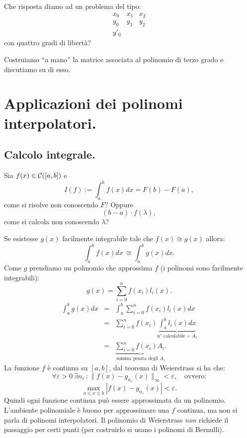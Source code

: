 \begin{ese}
Che risposta diamo ad un problema del tipo:
\[\begin{array}{ccc}
x_0 & x_1 & x_2 \\
y_0 & y_1 & y_2 \\
y'_0
\end{array}\]
con quattro gradi di libertà?
\begin{flushleft}
Costruiamo ``a mano'' la matrice associata al polinomio di terzo grado e
discutiamo su di esso.
\end{flushleft}
\end{ese}

\section{Applicazioni dei polinomi interpolatori.}
\subsection*{Calcolo integrale.}
Sia $f(x) \in \mathcal{C}([a,b])$ e
\[I(f) := \int_a^bf(x)dx = F(b)-F(a),\]
come si risolve non conoscendo $F$? Oppure
\[(b-a)\cdot f(\lambda),\]
come si calcola non conoscendo $\lambda$?
\begin{flushleft}
Se esistesse $g(x)$ facilmente integrabile tale che $f(x) \cong g(x)$ allora:
\[\int_a^bf(x)dx\, \cong \int_a^bg(x)dx.\]
Come $g$ prendiamo un polinomio che approssima $f$ (i polinomi sono
facilmente integrabili):
\[g(x) = \sum_{i = 0}^nf(x_i)l_i(x).\]
\[
\begin{array}{lcl}\displaystyle
\int_a^bg(x)dx & = & \displaystyle\int_a^b\sum_{i = 0}^nf(x_i)l_i(x)dx \\
& = & \displaystyle
\sum_{i = 0}^nf(x_i)\underbrace{\int_a^bl_i(x)dx}_{\textrm{n° calcolabile}
= A_i} \\
& = & \displaystyle
\underbrace{\sum_{i = 0}^nf(x_i)A_i.}_{\textrm{somma pesata degli }A_i}
\end{array}
\]
La funzione $f$ è continua su $[a,b]$, dal teorema di Weierstrass si ha che:
\[\forall \varepsilon > 0\ \exists n_{\varepsilon} \, \colon \|f(x) -
g_{n_{\varepsilon}}(x)\|_{\infty} < \varepsilon, \quad \textrm{ovvero:}\]
\[\max_{a \leq x \leq b}|f(x) -g_{n_{\varepsilon}}(x)| < \varepsilon.\]
Quindi ogni funzione continua può essere approssimata da un polinomio.
L'ambiente polinomiale è buono per approssimare una $f$ continua, ma non si
parla di polinomi interpolatori. Il polinomio di Weierstrass \emph{non}
richiede il passaggio per certi punti (per costruirlo si usano i polinomi di
Bernulli).
\end{flushleft}

